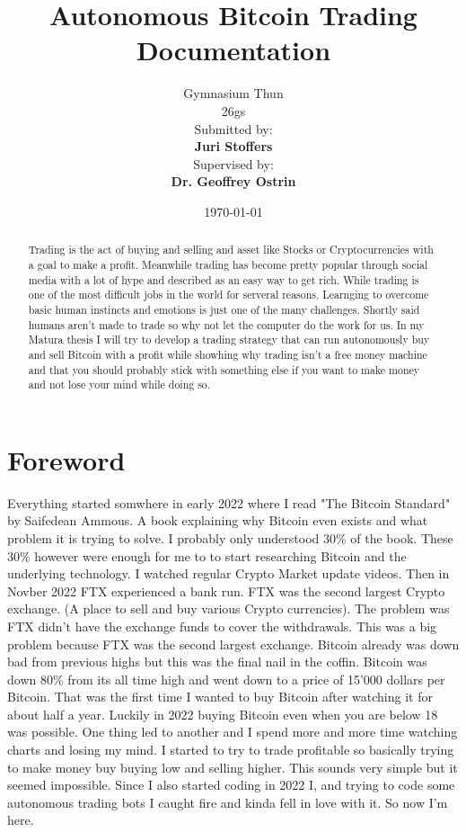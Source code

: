 \documentclass[12pt]{article}
\title{\Huge Autonomous Bitcoin Trading\\\vspace{1cm}\Large Documentation}
\author{
    \Large Gymnasium Thun\\
     26gs\\
    \vspace{1cm}
    \Large Submitted by:\\
    \vspace{0.5cm}
    \textbf{Juri Stoffers}\\
    \vspace{2cm}
    \Large Supervised by:\\
    \vspace{0.5cm}
    \textbf{Dr. Geoffrey Ostrin}
}
\date{\Large \today}
\begin{document}
\begin{titlepage}
\maketitle
\end{titlepage}

\begin{abstract}
    \begin{center}
        Trading is the act of buying and selling and asset like Stocks or Cryptocurrencies with a goal to make a profit. Meanwhile trading has become pretty popular through social media with a lot of hype and described as an easy way to get rich. While trading is one of the most difficult jobs in the world for serveral reasons. Learnging to overcome basic human instincts and emotions is just one of the many challenges.
        Shortly said humans aren't made to trade so why not let the computer do the work for us. In my Matura thesis I will try to develop a trading strategy that can run autonomously buy and sell Bitcoin with a profit while showhing why trading isn't a free money machine and that you should probably stick with something else if you want to make money and not lose your mind while doing so.
    \end{center}
\end{abstract}

\tableofcontents
\clearpage




\section{Foreword}
Everything started somwhere in early 2022 where I read "The Bitcoin Standard" by Saifedean Ammous. A book explaining why Bitcoin even exists and what problem it is trying to solve. I probably only understood 30\% of the book. These 30\% however were enough for me to to start researching Bitcoin and the underlying technology. I watched regular Crypto Market update videos. Then in Novber 2022 FTX experienced a bank run.
FTX was the second largest Crypto exchange. (A place to sell and buy various Crypto currencies). The problem was FTX didn't have the exchange funds to cover the withdrawals. This was a big problem because FTX was the second largest exchange. Bitcoin already was down bad from previous highs but this was the final nail in the coffin. Bitcoin was down 80\% from its all time high and went down to a price of 15'000 dollars per Bitcoin.
That was the first time I wanted to buy Bitcoin after watching it for about half a year. Luckily in 2022 buying Bitcoin even when you are below 18 was possible.
One thing led to another and I spend more and more time watching charts and losing my mind. I started to try to trade profitable so basically trying to make money buy buying low and selling higher.
This sounds very simple but it seemed impossible. Since I also started coding in 2022 I, and trying to code some autonomous trading bots I caught fire and kinda fell in love with it.
So now I'm here.
\end{document}
